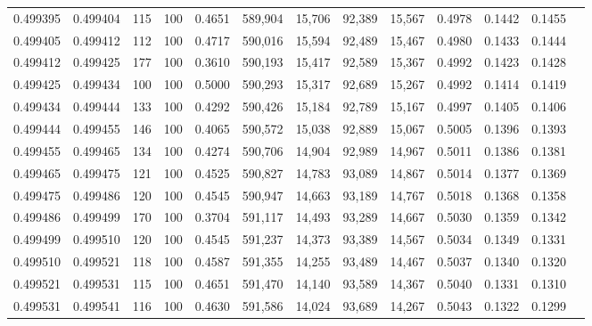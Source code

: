 \begin{tabular}{rrrrrrrrrrrrr}
0.499395 & 0.499404 &   115 & 100 &                                     0.4651 & 589,904 &  15,706 &  92,389 &  15,567 & 0.4978 & 0.1442 & 0.1455 \\
0.499405 & 0.499412 &   112 & 100 &                                     0.4717 & 590,016 &  15,594 &  92,489 &  15,467 & 0.4980 & 0.1433 & 0.1444 \\
0.499412 & 0.499425 &   177 & 100 &                                     0.3610 & 590,193 &  15,417 &  92,589 &  15,367 & 0.4992 & 0.1423 & 0.1428 \\
0.499425 & 0.499434 &   100 & 100 &                                     0.5000 & 590,293 &  15,317 &  92,689 &  15,267 & 0.4992 & 0.1414 & 0.1419 \\
0.499434 & 0.499444 &   133 & 100 &                                     0.4292 & 590,426 &  15,184 &  92,789 &  15,167 & 0.4997 & 0.1405 & 0.1406 \\
0.499444 & 0.499455 &   146 & 100 &                                     0.4065 & 590,572 &  15,038 &  92,889 &  15,067 & 0.5005 & 0.1396 & 0.1393 \\
0.499455 & 0.499465 &   134 & 100 &                                     0.4274 & 590,706 &  14,904 &  92,989 &  14,967 & 0.5011 & 0.1386 & 0.1381 \\
0.499465 & 0.499475 &   121 & 100 &                                     0.4525 & 590,827 &  14,783 &  93,089 &  14,867 & 0.5014 & 0.1377 & 0.1369 \\
0.499475 & 0.499486 &   120 & 100 &                                     0.4545 & 590,947 &  14,663 &  93,189 &  14,767 & 0.5018 & 0.1368 & 0.1358 \\
0.499486 & 0.499499 &   170 & 100 &                                     0.3704 & 591,117 &  14,493 &  93,289 &  14,667 & 0.5030 & 0.1359 & 0.1342 \\
0.499499 & 0.499510 &   120 & 100 &                                     0.4545 & 591,237 &  14,373 &  93,389 &  14,567 & 0.5034 & 0.1349 & 0.1331 \\
0.499510 & 0.499521 &   118 & 100 &                                     0.4587 & 591,355 &  14,255 &  93,489 &  14,467 & 0.5037 & 0.1340 & 0.1320 \\
0.499521 & 0.499531 &   115 & 100 &                                     0.4651 & 591,470 &  14,140 &  93,589 &  14,367 & 0.5040 & 0.1331 & 0.1310 \\
0.499531 & 0.499541 &   116 & 100 &                                     0.4630 & 591,586 &  14,024 &  93,689 &  14,267 & 0.5043 & 0.1322 & 0.1299 \\

\end{tabular}
